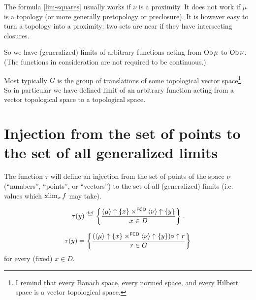 \begin{rem}
The formula \eqref{lim-squares} usually works if $\nu$ is a proximity.
It does not work if $\mu$ is a topology (or more generally pretopology or preclosure). It is however easy to turn a topology into a proximity: two sets are near if they have intersecting closures.
\end{rem}

So we have (generalized) limits of arbitrary functions
acting from $\operatorname{Ob}\mu$ to $\operatorname{Ob}\nu$. (The functions in consideration
are not required to be continuous.)

\begin{rem}
Most typically $G$ is the group of translations of some topological vector space\footnote{I remind that every Banach space, every normed space, and every Hilbert space is a vector topological space.}. So in particular we have defined limit of an arbitrary function acting from a vector topological space to a topological space.
\end{rem}

\section[Injection to generalized limits]{Injection from the set of points to the set of all generalized limits}

The function $\tau$ will define an injection from the set of points
of the space $\nu$ (``numbers'', ``points'', or ``vectors'')
to the set of all (generalized) limits (i.e. values which $\operatorname{xlim}_{x}f$
may take).
\begin{defn}
\[ \tau(y)\overset{\mathrm{def}}{=}\left\{ \frac{\left\langle \mu\right\rangle\uparrow\{x\}\times^{\mathsf{FCD}}\left\langle \nu\right\rangle\uparrow\{y\}}{x\in D}\right\}. \]
\end{defn}
\begin{prop}
\[ \tau(y)=\left\{ \frac{(\left\langle \mu\right\rangle\uparrow\{x\}\times^{\mathsf{FCD}}\left\langle \nu\right\rangle\uparrow\{y\})\circ\uparrow r}{r\in G}\right\} \]
for every (fixed) $x\in D$.\end{prop}

